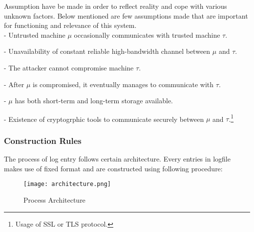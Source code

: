 \documentclass[12pt, letter]{article}
\begin{document}
Assumption have be made in order to reflect reality and cope with various unknown factors. Below mentioned are few assumptions made that are important for functioning and relevance of this system.\\

- Untrusted machine $\mu$ occasionally communicates with trusted machine $\tau$.

- Unavailability of constant reliable high-bandwidth channel between $\mu$ and $\tau$.

- The attacker cannot compromise machine $\tau$.

- After $\mu$ is compromised, it eventually manages to communicate with $\tau$.

- $\mu$ has both short-term and long-term storage available.

- Existence of cryptogrphic tools to communicate securely between $\mu$ and $\tau$.\footnote{Usage of SSL or TLS protocol.}

\subsubsection{Construction Rules}

The process of log entry follows certain architecture. Every entries in logfile makes use of fixed format and are constructed using following procedure:

\begin{figure}
    \centering
    \texttt{[image: architecture.png]}
    \caption{Process Architecture}
    \label{fig:architecture}
\end{figure}
\end{document}

